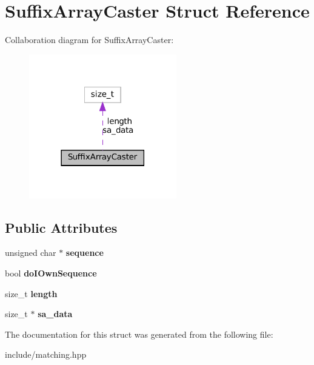 \hypertarget{structSuffixArrayCaster}{}\section{Suffix\+Array\+Caster Struct Reference}
\label{structSuffixArrayCaster}


Collaboration diagram for Suffix\+Array\+Caster\+:\nopagebreak
\begin{figure}[H]
\begin{center}
\leavevmode
\includegraphics[width=182pt]{structSuffixArrayCaster__coll__graph}
\end{center}
\end{figure}
\subsection*{Public Attributes}
\begin{DoxyCompactItemize}
\item 
\mbox{\label{structSuffixArrayCaster_a6256a8e22b3d80ad35bebd31cda53f0c}} 
unsigned char $\ast$ {\bfseries sequence}
\item 
\mbox{\label{structSuffixArrayCaster_a9bf4ea707e59089a662b4170151395e0}} 
bool {\bfseries do\+I\+Own\+Sequence}
\item 
\mbox{\label{structSuffixArrayCaster_a89b4f204e877c82ac0da03067d36333e}} 
size\+\_\+t {\bfseries length}
\item 
\mbox{\label{structSuffixArrayCaster_adc11d827fd2d9207b98ea078a602e807}} 
size\+\_\+t $\ast$ {\bfseries sa\+\_\+data}
\end{DoxyCompactItemize}


The documentation for this struct was generated from the following file\+:\begin{DoxyCompactItemize}
\item 
include/matching.\+hpp\end{DoxyCompactItemize}
